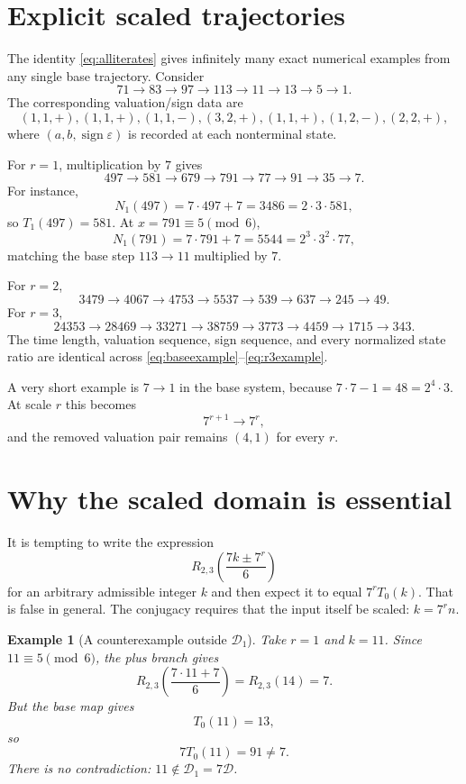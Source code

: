 \documentclass[11pt]{article}
\newtheorem{example}[theorem]{Example}
\newcommand{\eps}{\varepsilon}
\newcommand{\Rtwothree}{R_{2,3}}
\begin{document}
\section{Explicit scaled trajectories}
The identity \eqref{eq:alliterates} gives infinitely many exact numerical examples from any single base trajectory. Consider
\begin{equation}
71\to83\to97\to113\to11\to13\to5\to1.
\label{eq:baseexample}
\end{equation}
The corresponding valuation/sign data are
\[
(1,1,+),(1,1,+),(1,1,-),(3,2,+),(1,1,+),(1,2,-),(2,2,+),
\]
where $(a,b,\operatorname{sign}\eps)$ is recorded at each nonterminal state.

For $r=1$, multiplication by $7$ gives
\begin{equation}
497\to581\to679\to791\to77\to91\to35\to7.
\label{eq:r1example}
\end{equation}
For instance,
\[
N_1(497)=7\cdot497+7=3486=2\cdot3\cdot581,
\]
so $T_1(497)=581$. At $x=791\equiv5\pmod6$,
\[
N_1(791)=7\cdot791+7=5544=2^3\cdot3^2\cdot77,
\]
matching the base step $113\to11$ multiplied by $7$.

For $r=2$,
\begin{equation}
3479\to4067\to4753\to5537\to539\to637\to245\to49.
\label{eq:r2example}
\end{equation}
For $r=3$,
\begin{equation}
24353\to28469\to33271\to38759\to3773\to4459\to1715\to343.
\label{eq:r3example}
\end{equation}
The time length, valuation sequence, sign sequence, and every normalized state ratio are identical across \eqref{eq:baseexample}--\eqref{eq:r3example}.

A very short example is $7\to1$ in the base system, because $7\cdot7-1=48=2^4\cdot3$. At scale $r$ this becomes
\[
7^{r+1}\to7^r,
\]
and the removed valuation pair remains $(4,1)$ for every $r$.

\section{Why the scaled domain is essential}
It is tempting to write the expression
\[
\Rtwothree\!\left(\frac{7k\pm7^r}{6}\right)
\]
for an arbitrary admissible integer $k$ and then expect it to equal $7^rT_0(k)$. That is false in general. The conjugacy requires that the input itself be scaled: $k=7^rn$.

\begin{example}[A counterexample outside $\mathcal D_1$]
Take $r=1$ and $k=11$. Since $11\equiv5\pmod6$, the plus branch gives
\[
\Rtwothree\!\left(\frac{7\cdot11+7}{6}\right)
=\Rtwothree(14)=7.
\]
But the base map gives
\[
T_0(11)=13,
\]
so
\[
7T_0(11)=91\ne7.
\]
There is no contradiction: $11\notin\mathcal D_1=7\mathcal D$.
\end{example}
\end{document}
